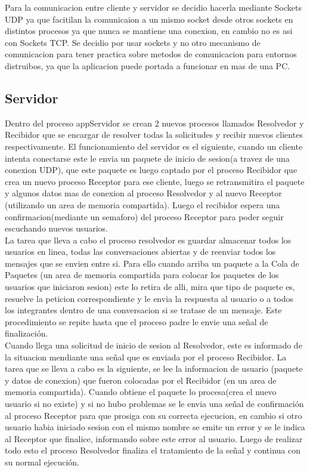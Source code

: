 \documentclass[a4paper,12pt,titlepage]{article}
\begin{document}
Para la comunicacion entre cliente y servidor se decidio hacerla mediante Sockets UDP ya que facitilan la comunicaion a un mismo socket desde otros sockets en distintos procesos ya que nunca se mantiene una conexion, en cambio no es asi con Sockets TCP. Se decidio por usar sockets y no otro mecanismo de comunicacion para tener practica sobre metodos de comunicacion para entornos distruibos, ya que la aplicacion puede portada a funcionar en mas de una PC.

\subsection{Servidor}

Dentro del proceso appServidor se crean 2 nuevos procesos llamados Resolvedor y Recibidor que se encargar de resolver todas la solicitudes y recibir nuevos clientes respectivamente.
El funcionamiento del servidor es el siguiente, cuando un cliente intenta conectarse este le envia un paquete de inicio de sesion(a travez de una conexion UDP), que este paquete es luego captado por el proceso Recibidor que crea un nuevo proceso Receptor para ese cliente, luego se retransmitira el paquete y algunos datos mas de conexion al proceso Resolvedor y al nuevo Receptor (utilizando un area de memoria compartida). Luego el recibidor espera una confirmacion(mediante un semaforo) del proceso Receptor para poder seguir escuchando nuevos usuarios.\\

La tarea que lleva a cabo el proceso resolvedor es guardar almacenar todos los usuarios en linea, todas las conversaciones abiertas y de reenviar todos los mensajes que se envien entre si. Para ello cuando arriba un paquete a la Cola de Paquetes (un area de memoria compartida para colocar los paquetes de los usuarios que iniciaron sesion) este lo retira de alli, mira que tipo de paquete es, resuelve la peticion correspondiente y le envia la respuesta al usuario o a todos los integrantes dentro de una conversacion si se tratase de un mensaje. Este procedimiento se repite hasta que el proceso padre le envie una señal de finalización.\\

Cuando llega una solicitud de inicio de sesion al Resolvedor, este es informado de la situacion mendiante una señal que es enviada por el proceso Recibidor. La tarea que se lleva a cabo es la siguiente, se lee la informacion de usuario (paquete y datos de conexion) que fueron colocadas por el Recibidor (en un area de memoria compartida). Cuando obtiene el paquete lo procesa(crea el nuevo usuario si no existe) y si no hubo problemas se le envia una señal de confirmación al proceso Receptor para que prosiga con su correcta ejecucion, en cambio si otro usuario habia iniciado sesion con el mismo nombre se emite un error y se le indica al Receptor que finalice, informando sobre este error al usuario. Luego de realizar todo esto el proceso Resolvedor finaliza el tratamiento de la señal y continua con su normal ejecución.\\
\end{document}
